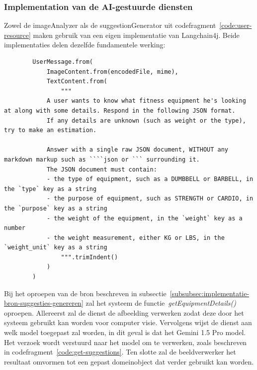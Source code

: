 \subsubsection{Implementation van de AI-gestuurde diensten}
Zowel de imageAnalyzer als de suggestionGenerator uit codefragment~\ref{code:user-resource} maken gebruik van een eigen implementatie van Langchain4j.
Beide implementaties delen dezelfde fundamentele werking:
\begin{listing}[H]
    \begin{verbatim}
        UserMessage.from(
            ImageContent.from(encodedFile, mime),
            TextContent.from(
                """
            A user wants to know what fitness equipment he's looking at along with some details. Respond in the following JSON format.
            If any details are unknown (such as weight or the type), try to make an estimation.

            Answer with a single raw JSON document, WITHOUT any markdown markup such as ````json or ``` surrounding it.
            The JSON document must contain:
            - the type of equipment, such as a DUMBBELL or BARBELL, in the `type` key as a string
            - the purpose of equipment, such as STRENGTH or CARDIO, in the `purpose` key as a string
            - the weight of the equipment, in the `weight` key as a number
            - the weight measurement, either KG or LBS, in the `weight_unit` key as a string
                """.trimIndent()
            )
        )
    \end{verbatim}
\end{listing}
\label{code:get-suggestions}
Bij het oproepen van de bron beschreven in subsectie~\ref{subsubsec:implementatie-bron-suggesties-genereren} zal het systeem de functie~\textit{getEquipmentDetails()} oproepen.
Allereerst zal de dienst de afbeelding verwerken zodat deze door het systeem gebruikt kan worden voor computer visie.
Vervolgens wijst de dienst aan welk model toegepast zal worden, in dit geval is dat het Gemini 1.5 Pro model.
Het verzoek wordt verstuurd naar het model om te verwerken, zoals beschreven in codefragment~\ref{code:get-suggestions}.
Ten slotte zal de beeldverwerker het resultaat omvormen tot een gepast domeinobject dat verder gebruikt kan worden.

